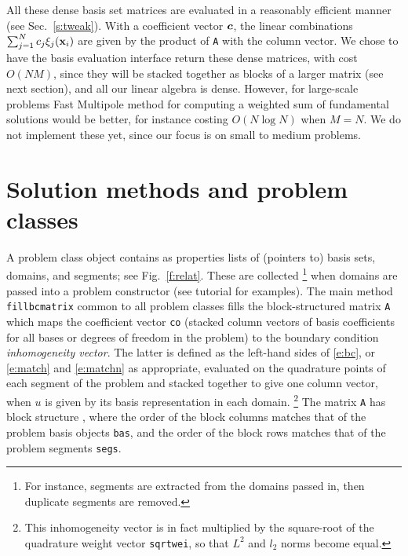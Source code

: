 \documentclass[12pt]{article}
\begin{document}
All these dense basis set matrices
are evaluated in a reasonably efficient manner
(see Sec.~\ref{s:tweak}).
With a coefficient vector ${\bm c}$, the linear combinations
$\sum_{j=1}^N c_j \xi_j(\textbf{x}_i)$ are given by the product
of {\tt A} with the column vector.
We chose to have the basis evaluation interface return these dense
matrices, with cost $O(NM)$,
since they will be stacked together as blocks of a larger
matrix (see next section), and all our linear algebra is dense.
However, for large-scale problems Fast Multipole method for computing
a weighted sum of fundamental solutions would be
better, for instance costing $O(N\log N)$ when $M=N$.
We do not implement these yet, since our focus is on small to medium
problems.




\section{Solution methods and problem classes}

A problem class object contains as properties lists of (pointers to)
basis sets, domains, and segments; see Fig.~\ref{f:relat}.
These are collected%
  \footnote{For instance, segments are extracted from the domains passed in,
    then duplicate segments are removed.}
when domains are passed into a problem
constructor (see tutorial for examples).
The main method {\tt fillbcmatrix} common to all problem classes
fills the block-structured matrix {\tt A} which maps the
coefficient vector {\tt co} 
(stacked column vectors of basis coefficients for all
bases or degrees of freedom in the problem)
to the boundary condition {\em inhomogeneity vector}.
The latter is defined as the left-hand sides of
\eqref{e:bc}, or \eqref{e:match} and \eqref{e:matchn}
as appropriate, evaluated on the quadrature points
of each segment of the problem
and stacked together to give one column vector,
when $u$ is given by its basis representation in each domain.%
  \footnote{This inhomogeneity vector is in fact multiplied by the
    square-root of the quadrature weight vector {\tt sqrtwei},
    so that $L^2$ and $l_2$ norms become equal.}
The matrix {\tt A} has block structure \cite{polygonscatt}, where the
order of the block columns matches that of the problem basis
objects {\tt bas}, and the order of the block rows
matches that of the problem segments {\tt segs}.
\end{document}
